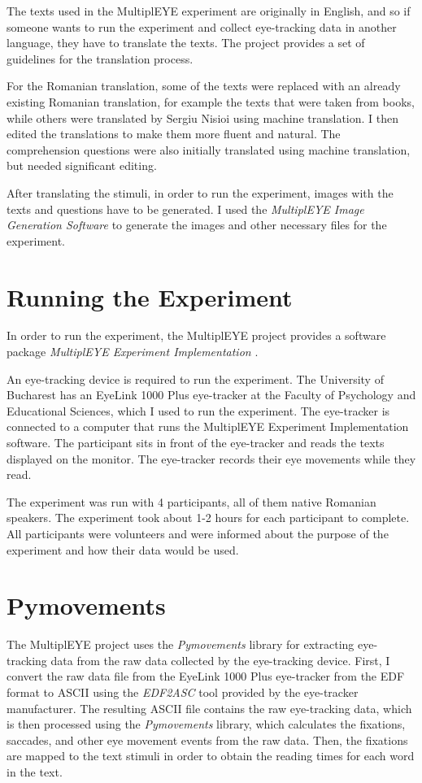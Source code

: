 The texts used in the MultiplEYE experiment are originally in English, and so if someone wants to run the experiment and collect eye-tracking data in another language, they have to translate the texts. The project provides a set of guidelines for the translation process. 

For the Romanian translation, some of the texts were replaced with an already existing Romanian translation, for example the texts that were taken from books, while others were translated by Sergiu Nisioi using machine translation. I then edited the translations to make them more fluent and natural. The comprehension questions were also initially translated using machine translation, but needed significant editing.

After translating the stimuli, in order to run the experiment, images with the texts and questions have to be generated. I used the \textit{MultiplEYE Image Generation Software} \cite{Jakobi2025_MultiplEYE} to generate the images and other necessary files for the experiment.

\section{Running the Experiment}
In order to run the experiment, the MultiplEYE project provides a software package \textit{MultiplEYE Experiment Implementation} \cite{MultiplEYE_ExperimentImplementation2025}. 

An eye-tracking device is required to run the experiment. The University of Bucharest has an EyeLink 1000 Plus eye-tracker at the Faculty of Psychology and Educational Sciences, which I used to run the experiment. The eye-tracker is connected to a computer that runs the MultiplEYE Experiment Implementation software. The participant sits in front of the eye-tracker and reads the texts displayed on the monitor. The eye-tracker records their eye movements while they read.

The experiment was run with 4 participants, all of them native Romanian speakers. The experiment took about 1-2 hours for each participant to complete. All participants were volunteers and were informed about the purpose of the experiment and how their data would be used. 

\section{Pymovements}
The MultiplEYE project uses the \textit{Pymovements} library \cite{Krakowczyk2023_pymovements} for extracting eye-tracking data from the raw data collected by the eye-tracking device. First, I convert the raw data file from the EyeLink 1000 Plus eye-tracker from the EDF format to ASCII using the \textit{EDF2ASC} tool provided by the eye-tracker manufacturer. The resulting ASCII file contains the raw eye-tracking data, which is then processed using the \textit{Pymovements} library, which calculates the fixations, saccades, and other eye movement events from the raw data. Then, the fixations are mapped to the text stimuli in order to obtain the reading times for each word in the text.

